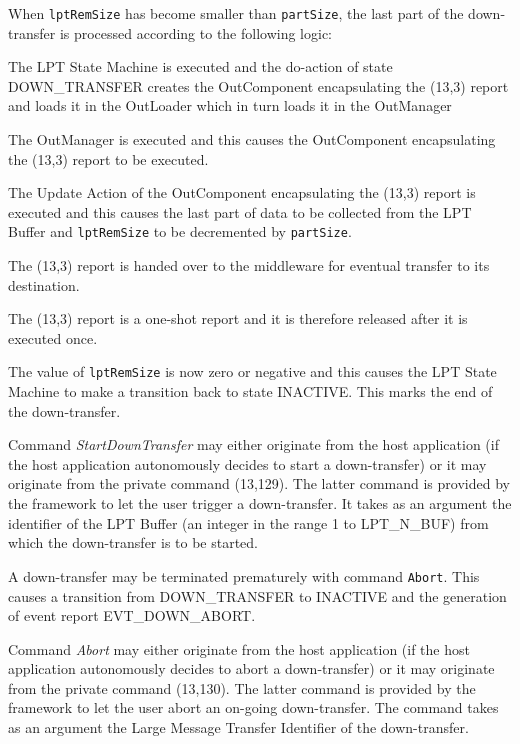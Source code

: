 \documentclass{pnp_article}
\begin{document}
When \texttt{lptRemSize} has become smaller than \texttt{partSize}, the last part of the down-transfer is processed according to the following logic:

\begin{fw_enumerate}
\item The LPT State Machine is executed and the do-action of state DOWN\_TRANSFER creates the OutComponent encapsulating the (13,3) report and loads it in the OutLoader which in turn loads it in the OutManager
\item The OutManager is executed and this causes the OutComponent encapsulating the (13,3) report to be executed.
\item The Update Action of the OutComponent encapsulating the (13,3) report is executed and this causes the last part of data to be collected from the LPT Buffer and \texttt{lptRemSize} to be decremented by \texttt{partSize}.
\item The (13,3) report is handed over to the middleware for eventual transfer to its destination.
\item The (13,3) report is a one-shot report and it is therefore released after it is executed once.
\item The value of \texttt{lptRemSize} is now zero or negative and this causes the LPT State Machine to make a transition back to state INACTIVE. This marks the end of the down-transfer.
\end{fw_enumerate}

Command \textit{StartDownTransfer} may either originate from the host application (if the host application autonomously decides to start a down-transfer) or it may originate from the private command (13,129). The latter command is provided by the framework to let the user trigger a down-transfer. It takes as an argument the identifier of the LPT Buffer (an integer in the range 1 to LPT\_N\_BUF) from which the down-transfer is to be started.

A down-transfer may be terminated prematurely with command \texttt{Abort}. This causes a transition from DOWN\_TRANSFER to INACTIVE and the generation of event report EVT\_DOWN\_ABORT.

Command \textit{Abort} may either originate from the host application (if the host application autonomously decides to abort a down-transfer) or it may originate from the private command (13,130). The latter command is provided by the framework to let the user abort an on-going down-transfer. The command takes as an argument the Large Message Transfer Identifier of the down-transfer. 
\end{document}
